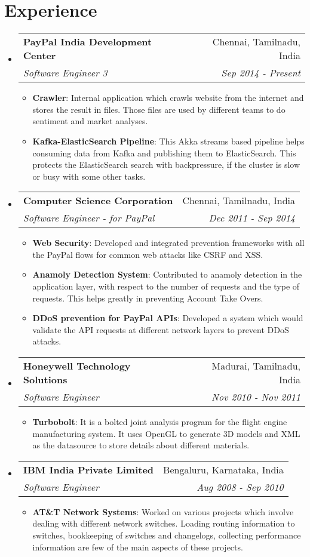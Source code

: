 \documentclass[letterpaper,11pt]{article}
\makeatletter
\newcommand{\resumeItem}[2]{
  \item\small{
    \textbf{#1}{: #2 \vspace{-2pt}}
  }
}
\newcommand{\resumeSubheading}[4]{
  \vspace{-1pt}\item
    \begin{tabular*}{0.97\textwidth}{l@{\extracolsep{\fill}}r}
      \textbf{#1} & #2 \\
      \textit{\small#3} & \textit{\small #4} \\
    \end{tabular*}\vspace{-5pt}
}
\newcommand{\resumeSubHeadingListStart}{\begin{itemize}[leftmargin=*]}
\newcommand{\resumeSubHeadingListEnd}{\end{itemize}}
\newcommand{\resumeItemListStart}{\begin{itemize}}
\newcommand{\resumeItemListEnd}{\end{itemize}\vspace{-5pt}}
\makeatother
\begin{document}
\section{Experience}
  \resumeSubHeadingListStart

    \resumeSubheading
      {PayPal India Development Center}{Chennai, Tamilnadu, India}
      {Software Engineer 3}{Sep 2014 - Present}
      \resumeItemListStart
        \resumeItem{Crawler}
          {Internal application which crawls website from the internet and stores the result in files. Those files are used by different teams to do sentiment and market analyses.}
        \resumeItem{Kafka-ElasticSearch Pipeline}
          {This Akka streams based pipeline helps consuming data from Kafka and publishing them to ElasticSearch. This protects the ElasticSearch search with backpressure, if the cluster is slow or busy with some other tasks.}
      \resumeItemListEnd

    \resumeSubheading
      {Computer Science Corporation}{Chennai, Tamilnadu, India}
      {Software Engineer - for PayPal}{Dec 2011 - Sep 2014}
      \resumeItemListStart
        \resumeItem{Web Security}
          {Developed and integrated prevention frameworks with all the PayPal flows for common web attacks like CSRF and XSS.}
        \resumeItem{Anamoly Detection System}
          {Contributed to anamoly detection in the application layer, with respect to the number of requests and the type of requests. This helps greatly in preventing Account Take Overs.}
        \resumeItem{DDoS prevention for PayPal APIs}
          {Developed a system which would validate the API requests at different network layers to prevent DDoS attacks.}
      \resumeItemListEnd

    \resumeSubheading
      {Honeywell Technology Solutions}{Madurai, Tamilnadu, India}
      {Software Engineer}{Nov 2010 - Nov 2011}
      \resumeItemListStart
        \resumeItem{Turbobolt}
          {It is a bolted joint analysis program for the flight engine manufacturing system. It uses OpenGL to generate 3D models and XML as the datasource to store details about different materials.}
      \resumeItemListEnd

    \resumeSubheading
      {IBM India Private Limited}{Bengaluru, Karnataka, India}
      {Software Engineer}{Aug 2008 - Sep 2010}
      \resumeItemListStart
        \resumeItem{AT\&T Network Systems}
          {Worked on various projects which involve dealing with different network switches. Loading routing information to switches, bookkeeping of switches and changelogs, collecting performance information are few of the main aspects of these projects.}
      \resumeItemListEnd

  \resumeSubHeadingListEnd

\end{document}

